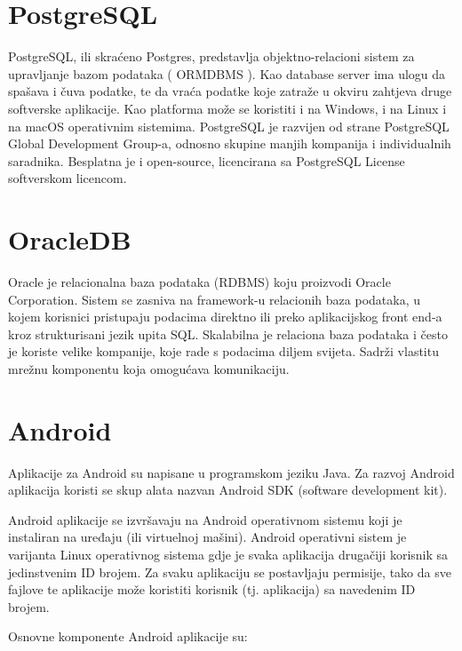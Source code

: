 \documentclass[12pt, a4paper]{report}
\theoremstyle{definition}
\begin{document}
\section{PostgreSQL}

PostgreSQL, ili skraćeno Postgres, predstavlja objektno-relacioni sistem za upravljanje bazom podataka ( ORMDBMS ). Kao database server ima ulogu da spašava i čuva podatke, te da vraća podatke koje zatraže u okviru zahtjeva druge softverske aplikacije. Kao platforma može se koristiti i na Windows, i na Linux i na macOS operativnim sistemima. PostgreSQL je razvijen od strane PostgreSQL Global Development Group-a, odnosno skupine manjih kompanija i individualnih saradnika. Besplatna je i open-source, licencirana sa PostgreSQL License softverskom licencom.

\section{OracleDB}
Oracle je relacionalna baza podataka (RDBMS) koju proizvodi Oracle Corporation.
Sistem se zasniva na framework-u relacionih baza podataka, u kojem korisnici pristupaju podacima direktno ili preko aplikacijskog front end-a kroz strukturisani jezik upita SQL. Skalabilna je relaciona baza podataka i često je koriste velike kompanije, koje rade s podacima diljem svijeta. Sadrži vlastitu mrežnu komponentu koja omogućava komunikaciju.

\section{Android}

Aplikacije za Android su napisane u programskom jeziku Java. Za razvoj Android aplikacija koristi se skup alata nazvan Android SDK (software development kit). 

Android aplikacije se izvršavaju na Android operativnom sistemu koji je instaliran na uređaju (ili virtuelnoj mašini). Android operativni sistem je varijanta Linux operativnog sistema gdje je svaka aplikacija drugačiji korisnik sa jedinstvenim ID brojem. Za svaku aplikaciju se postavljaju permisije, tako da sve fajlove te aplikacije može koristiti korisnik (tj. aplikacija) sa navedenim ID brojem.

Osnovne komponente Android aplikacije su:
\end{document}
